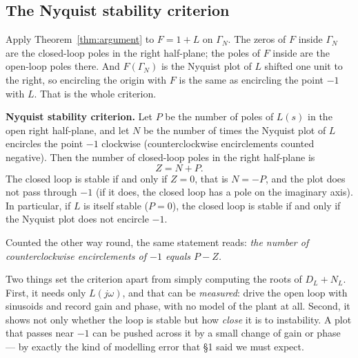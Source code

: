 \documentclass[11pt]{article}
\begin{document}
\subsection{The Nyquist stability criterion}
Apply Theorem~\ref{thm:argument} to $F=1+L$ on $\Gamma_N$. The zeros of $F$ inside
$\Gamma_N$ are the closed-loop poles in the right half-plane; the poles of $F$ inside
are the open-loop poles there. And $F(\Gamma_N)$ is the Nyquist plot of $L$ shifted
one unit to the right, so encircling the origin with $F$ is the same as encircling
the point $-1$ with $L$. That is the whole criterion.

\begin{keybox}
\textbf{Nyquist stability criterion.} Let $P$ be the number of poles of $L(s)$ in
the open right half-plane, and let $N$ be the number of times the Nyquist plot of
$L$ encircles the point $-1$ clockwise (counterclockwise encirclements counted
negative). Then the number of closed-loop poles in the right half-plane is
\[
   Z = N + P .
\]
The closed loop is stable if and only if $Z=0$, that is $N=-P$, and the plot does
not pass through $-1$ (if it does, the closed loop has a pole on the imaginary
axis). In particular, if $L$ is itself stable ($P=0$), the closed loop is stable if
and only if the Nyquist plot does not encircle $-1$.

\smallskip\noindent
Counted the other way round, the same statement reads: \emph{the number of
counterclockwise encirclements of $-1$ equals $P-Z$.}
\end{keybox}

\begin{remark}
Two things set the criterion apart from simply computing the roots of $D_L+N_L$.
First, it needs only $L(j\omega)$, and that can be \emph{measured}: drive the open
loop with sinusoids and record gain and phase, with no model of the plant at all.
Second, it shows not only whether the loop is stable but how \emph{close} it is to
instability. A plot that passes near $-1$ can be pushed across it by a small change
of gain or phase --- by exactly the kind of modelling error that \S1 said we must
expect.
\end{remark}
\end{document}
